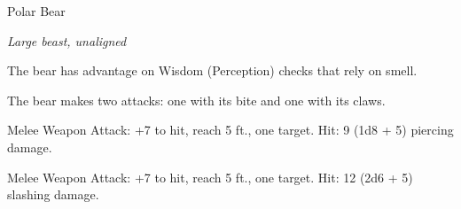 \begin{monsterbox}{Polar Bear}
\begin{hangingpar}
\textit{Large beast, unaligned}
\end{hangingpar}
\dndline%
\basics[%
armorclass = 12,
hitpoints = 5d10 + 15,
speed = {40 ft., swim 30 ft.}
]
\dndline%
\stats[%
STR = \stat{20},
DEX = \stat{10},
CON = \stat{16},
INT = \stat{2},
WIS = \stat{13},
CHA = \stat{7}
]
\dndline%
\details[%
skills={Perception +3, },
damageimmunities={},
savingthrows={},
conditionimmunities={},
damageresistances={},
damagevulnerabilities={},
senses={passive Perception 13},
challenge=2
]
\dndline%
\begin{monsteraction}
The bear has advantage on Wisdom (Perception) checks that rely on smell.
\end{monsteraction}
\begin{monsteraction}[Multiattack]
The bear makes two attacks: one with its bite and one with its claws.
\end{monsteraction}
\begin{monsteraction}[Bite]
Melee Weapon Attack: +7 to hit, reach 5 ft., one target. Hit: 9 (1d8 + 5) piercing damage.
\end{monsteraction}
\begin{monsteraction}[Claws]
Melee Weapon Attack: +7 to hit, reach 5 ft., one target. Hit: 12 (2d6 + 5) slashing damage.
\end{monsteraction}
\end{monsterbox}